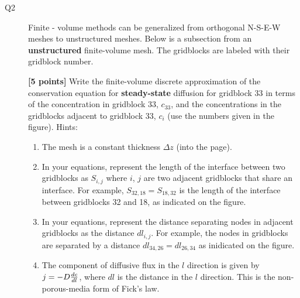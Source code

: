 \documentclass{article}
\begin{document}

\begin{description}
\item [Q2] Finite - volume methods can be generalized from orthogonal N-S-E-W meshes to unstructured meshes. Below is a subsection from an \textbf{unstructured} finite-volume mesh. The gridblocks are labeled with their gridblock number.\par
\textbf{[5 points]} Write the finite-volume discrete approximation of the conservation equation for \textbf{steady-state} diffusion for gridblock 33 in terms of the concentration in gridblock 33, $c_{33}$, and the concentrations in the gridblocks adjacent to gridblock 33, $c_i$ (use the numbers given in the figure). Hints:

\begin{enumerate}
\item The mesh is a constant thickness $\Delta z$ (into the page).
\item In your equations, represent the length of the interface between two gridblocks as $S_{i,j}$ where $i$, $j$ are two adjacent gridblocks that share an interface. For example, $S_{32,18}=S_{18,32}$ is the length of the interface between gridblocks 32 and 18, as indicated on the figure.
\item In your equations,  represent the distance separating nodes in adjacent gridblocks as the distance $dl_{i,j}$. For example, the nodes in gridblocks are separated by a distance $dl_{34,26}=dl_{26,34}$ as inidicated on the figure.
\item The component of diffusive flux in the $l$ direction is given by $j=-D{dc\over dl}$, where $dl$ is the distance in the $l$ direction. This is the non-porous-media form of Fick's law.
\end{enumerate}
\end{description}
\end{document}
